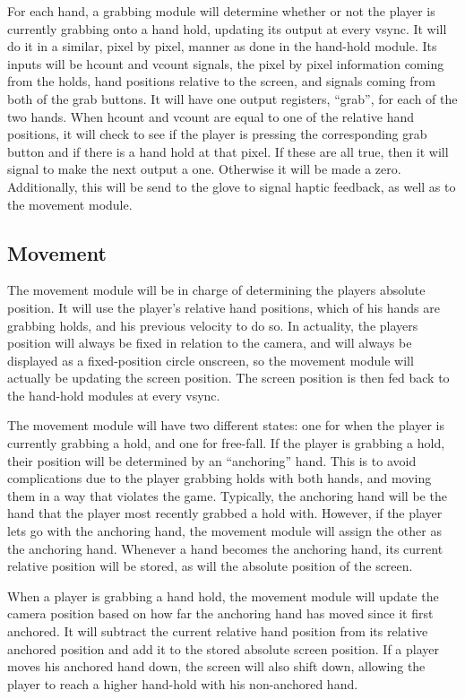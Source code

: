 For each hand, a grabbing module will determine whether or not the player is currently grabbing onto a hand hold, updating its output at every vsync. It will do it in a similar, pixel by pixel, manner as done in the hand-hold module. Its inputs will be hcount and vcount signals, the pixel by pixel information coming from the holds, hand positions relative to the screen, and signals coming from both of the grab buttons. It will have one output registers, “grab”, for each of the two hands. When hcount and vcount are equal to one of the relative hand positions, it will check to see if the player is pressing the corresponding grab button and if there is a hand hold at that pixel. If these are all true, then it will signal to make the next output a one. Otherwise it will be made a zero. Additionally, this will be send to the glove to signal haptic feedback, as well as to the movement module.	

\subsection{Movement}

The movement module will be in charge of determining the players absolute position. It will use the player's relative hand positions, which of his hands are grabbing holds, and his previous velocity to do so. In actuality, the players position will always be fixed in relation to the camera, and will always be displayed as a fixed-position circle onscreen, so the movement module will actually be updating the screen position. The screen position is then fed back to the hand-hold modules at every vsync. 

The movement module will have two different states: one for when the player is currently grabbing a hold, and one for free-fall. If the player is grabbing a hold, their position will be determined by an “anchoring” hand. This is to avoid complications due to the player grabbing holds with both hands, and moving them in a way that violates the game. Typically, the anchoring hand will be the hand that the player most recently grabbed a hold with. However, if the player lets go with the anchoring hand, the movement module will assign the other as the anchoring hand. Whenever a hand becomes the anchoring hand, its current relative position will be stored, as will the absolute position of the screen. 

When a player is grabbing a hand hold, the movement module will update the camera position based on how far the anchoring hand has moved since it first anchored. It will subtract the current relative hand position from its relative anchored position and add it to the stored absolute screen position. If a player moves his anchored hand down, the screen will also shift down, allowing the player to reach a higher hand-hold with his non-anchored hand.


